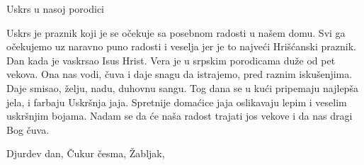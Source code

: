 Uskrs u nasoj porodici

Uskrs je praznik koji je se očekuje sa posebnom radosti u našem domu.
Svi ga očekujemo uz naravno puno radosti i veselja jer je to najveći Hrišćanski praznik.
Dan kada je vaskrsao Isus Hrist.
Vera je u srpskim porodicama duže od pet vekova. Ona nas vodi, čuva i daje snagu da istrajemo,
pred raznim iskušenjima. Daje smisao, želju, nadu, duhovnu sangu.
Tog dana se u kući pripemaju najlepša jela, i farbaju Uskršnja jaja.
Spretnije domaćice jaja oslikavaju lepim i veselim uskršnjim bojama.
Nadam se da će naša radost trajati jos vekove i da nas dragi Bog čuva.

Djurdev dan, Čukur česma, Žabljak, 